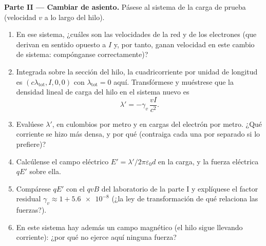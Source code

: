 \begin{problem}
\medskip\noindent\textbf{Parte II --- Cambiar de asiento.}
Pásese al sistema de la carga de prueba (velocidad $v$ a lo largo del hilo).
\begin{enumerate}[resume]
  \item En ese sistema, ¿cuáles son las velocidades de la red y de los
        electrones (que derivan en sentido opuesto a $I$ y, por tanto,
        ganan velocidad en este cambio de sistema: compónganse
        correctamente)?
  \item Integrada sobre la sección del hilo, la cuadricorriente por
        unidad de longitud es $(c\lambda_{\text{tot}}, I, 0, 0)$ con
        $\lambda_{\text{tot}} = 0$ aquí. Transfórmese y muéstrese que la
        densidad lineal de carga del hilo en el sistema nuevo es
        \[
        \lambda' = -\gamma_v\,\frac{vI}{c^2} .
        \]
  \item Evalúese $\lambda'$, en culombios por metro y en cargas del
        electrón por metro. ¿Qué corriente se hizo más densa, y por qué
        (contraiga cada una por separado si lo prefiere)?
  \item Calcúlense el campo eléctrico $E' = \lambda'/2\pi\varepsilon_0d$
        en la carga, y la fuerza eléctrica $qE'$ sobre ella.
  \item Compárese $qE'$ con el $qvB$ del laboratorio de la parte I y
        explíquese el factor residual $\gamma_v \approx 1 + \num{5.6e-8}$
        (¿la ley de transformación de qué  relaciona las
        fuerzas?).
  \item En este sistema hay además un campo magnético (el hilo sigue
        llevando corriente): ¿por qué no ejerce aquí ninguna fuerza?
\end{enumerate}


\end{problem}
